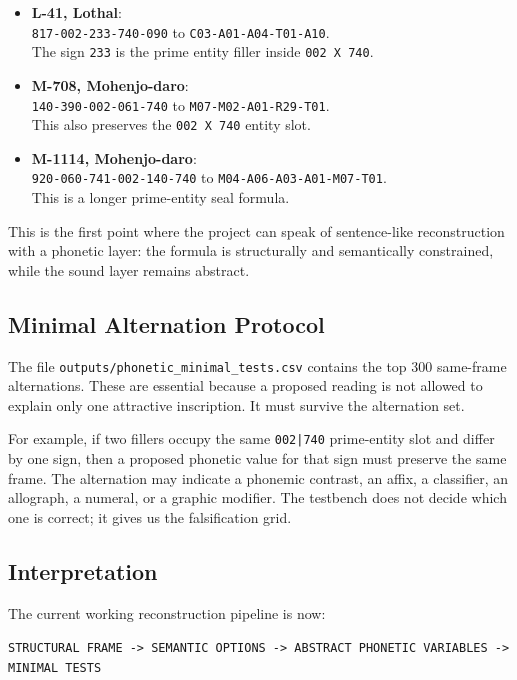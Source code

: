 \begin{itemize}
  \item \textbf{L-41, Lothal}:\\
  {\footnotesize\texttt{817-002-233-740-090} to \texttt{C03-A01-A04-T01-A10}}.\\
  The sign \texttt{233} is the prime entity filler inside \texttt{002 X 740}.
  \item \textbf{M-708, Mohenjo-daro}:\\
  {\footnotesize\texttt{140-390-002-061-740} to \texttt{M07-M02-A01-R29-T01}}.\\
  This also preserves the \texttt{002 X 740} entity slot.
  \item \textbf{M-1114, Mohenjo-daro}:\\
  {\footnotesize\texttt{920-060-741-002-140-740} to \texttt{M04-A06-A03-A01-M07-T01}}.\\
  This is a longer prime-entity seal formula.
\end{itemize}

This is the first point where the project can speak of sentence-like reconstruction with a phonetic layer: the formula is structurally and semantically constrained, while the sound layer remains abstract.

\subsection{Minimal Alternation Protocol}

The file \texttt{outputs/phonetic\_minimal\_tests.csv} contains the top 300 same-frame alternations. These are essential because a proposed reading is not allowed to explain only one attractive inscription. It must survive the alternation set.

For example, if two fillers occupy the same \texttt{002|740} prime-entity slot and differ by one sign, then a proposed phonetic value for that sign must preserve the same frame. The alternation may indicate a phonemic contrast, an affix, a classifier, an allograph, a numeral, or a graphic modifier. The testbench does not decide which one is correct; it gives us the falsification grid.

\subsection{Interpretation}

The current working reconstruction pipeline is now:

\begin{center}
\texttt{STRUCTURAL FRAME -> SEMANTIC OPTIONS -> ABSTRACT PHONETIC VARIABLES -> MINIMAL TESTS}
\end{center}

